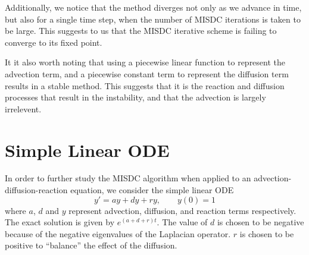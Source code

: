 \documentclass[12pt]{article}
\begin{document}
Additionally, we notice that the method diverges not only as we advance in time, 
but also for a single time step, when the number of MISDC iterations is taken 
to be large. This suggests to us that the MISDC iterative scheme is failing to 
converge to its fixed point.

It it also worth noting that using a piecewise linear function to represent the 
advection term, and a piecewise constant term to represent the diffusion term 
results in a stable method. This suggests that it is the reaction and diffusion 
processes that result in the instability, and that the advection is largely 
irrelevent.
\section{Simple Linear ODE}\label{sec:ode}
In order to further study the MISDC algorithm when applied to an advection-%
diffusion-reaction equation, we consider the simple linear ODE
\begin{equation}
    \label{lin}
    y' = ay + dy + ry, \qquad y(0) = 1
\end{equation}
where $a$, $d$ and $y$ represent advection, diffusion, and reaction terms 
respectively. The exact solution is given by $e^{(a+d+r)t}$. The value of $d$ 
is chosen to be negative because of the negative eigenvalues of the Laplacian 
operator. $r$ is chosen to be positive to ``balance'' the effect of the 
diffusion.
\end{document}
